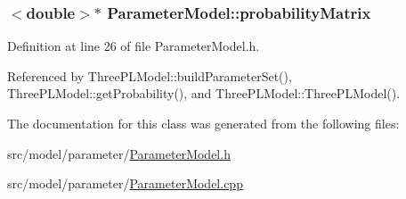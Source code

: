 \hypertarget{classParameterModel_a4be41bcd6697769578a729e2279014eb}{}
\subsubsection[{probability\+Matrix}]{$<$double$>$$\ast$ Parameter\+Model\+::probability\+Matrix}\label{classParameterModel_a4be41bcd6697769578a729e2279014eb}


Definition at line 26 of file Parameter\+Model.\+h.



Referenced by Three\+P\+L\+Model\+::build\+Parameter\+Set(), Three\+P\+L\+Model\+::get\+Probability(), and Three\+P\+L\+Model\+::\+Three\+P\+L\+Model().



The documentation for this class was generated from the following files\+:\begin{DoxyCompactItemize}
\item 
src/model/parameter/\hyperlink{ParameterModel_8h}{Parameter\+Model.\+h}\item 
src/model/parameter/\hyperlink{ParameterModel_8cpp}{Parameter\+Model.\+cpp}\end{DoxyCompactItemize}
